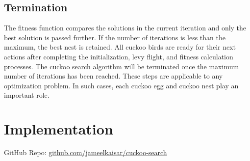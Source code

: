 \documentclass{article}
\begin{document}
\subsection*{Termination}
The fitness function compares the solutions in the current iteration and only the best solution is passed further. If the number of iterations is less than the maximum, the best nest is retained. All cuckoo birds are ready for their next actions after completing the initialization, levy flight, and fitness calculation processes. The cuckoo search algorithm will be terminated once the maximum number of iterations has been reached. These steps are applicable to any optimization problem. In such cases, each cuckoo egg and cuckoo nest play an important role.

\section*{Implementation}

GitHub Repo: \href{https://github.com/jameelkaisar/cuckoo-search}{github.com/jameelkaisar/cuckoo-search}
\end{document}
